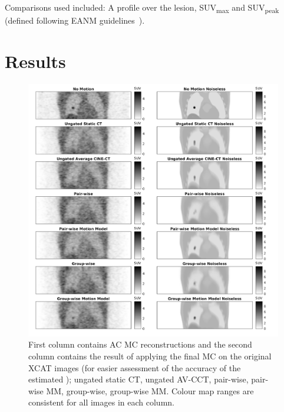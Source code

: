                 Comparisons used included: A profile over the lesion, \gls{SUV}\textsubscript{max} and \gls{SUV}\textsubscript{peak} (defined following \gls{EANM} guidelines~).
        
        \section{Results} \label{sec:comparison_of_motion_correction_methods_incorporating_motion_modelling_for_pet/ct_using_a_single_breath_hold_attenuation_map_results}
            \begin{figure}
                \centering
                
                \includegraphics[width=1.0\linewidth]{figures/motion_correction_results_3_visual_analysis.png}
                
                \captionsetup{singlelinecheck=false, justification=centering}
                \caption{First column contains \gls{AC} \gls{MC} reconstructions and the second column contains the result of applying the final  \gls{MC} on the original XCAT images (for easier assessment of the accuracy of the estimated ); ungated static \gls{CT}, ungated \gls{AV-CCT}, pair-wise, pair-wise \gls{MM}, group-wise, group-wise \gls{MM}. Colour map ranges are consistent for all images in each column.}
                \label{fig:comparison_of_motion_correction_methods_incorporating_motion_modelling_for_pet/ct_using_a_single_breath_hold_attenuation_map_visual_analysis}
            \end{figure}
            
